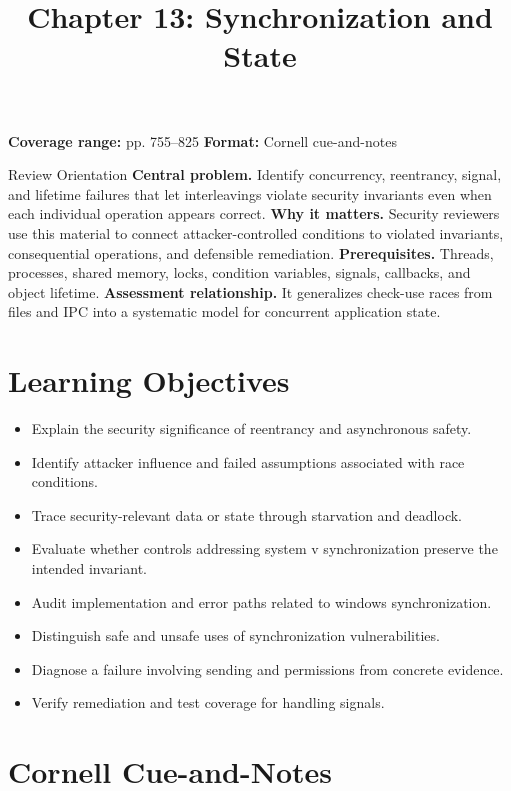 \documentclass[11pt,letterpaper]{article}
\title{Chapter 13: Synchronization and State}
\author{}
\date{}
\begin{document}
\maketitle

\begin{center}
\small\color{Meta}\textbf{Coverage range:} pp. 755--825 \quad\textbullet\quad \textbf{Format:} Cornell cue-and-notes
\end{center}
\vspace{0.25em}
\begin{CornellOverviewBox}{Review Orientation}
\textbf{Central problem.} Identify concurrency, reentrancy, signal, and lifetime failures that let interleavings violate security invariants even when each individual operation appears correct.
\textbf{Why it matters.} Security reviewers use this material to connect attacker-controlled conditions to violated invariants, consequential operations, and defensible remediation.
\textbf{Prerequisites.} Threads, processes, shared memory, locks, condition variables, signals, callbacks, and object lifetime.
\textbf{Assessment relationship.} It generalizes check-use races from files and IPC into a systematic model for concurrent application state.
\end{CornellOverviewBox}
\section{Learning Objectives}
\begin{itemize}
\item Explain the security significance of reentrancy and asynchronous safety.
\item Identify attacker influence and failed assumptions associated with race conditions.
\item Trace security-relevant data or state through starvation and deadlock.
\item Evaluate whether controls addressing system v synchronization preserve the intended invariant.
\item Audit implementation and error paths related to windows synchronization.
\item Distinguish safe and unsafe uses of synchronization vulnerabilities.
\item Diagnose a failure involving sending and permissions from concrete evidence.
\item Verify remediation and test coverage for handling signals.
\end{itemize}
\section{Cornell Cue-and-Notes}
\end{document}

